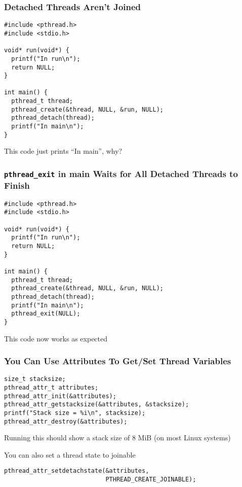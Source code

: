   \begin{frame}[fragile]
    \frametitle{Detached Threads Aren't Joined}

    \begin{lstlisting}
#include <pthread.h>
#include <stdio.h>

void* run(void*) {
  printf("In run\n");
  return NULL;
}

int main() {
  pthread_t thread;
  pthread_create(&thread, NULL, &run, NULL);
  pthread_detach(thread);
  printf("In main\n");
}
    \end{lstlisting}

    This code just prints ``In main'', why?
  \end{frame}

  \begin{frame}[fragile]
    \frametitle{\texttt{pthread\_exit} in main Waits for All Detached Threads to Finish}

    \begin{lstlisting}
#include <pthread.h>
#include <stdio.h>

void* run(void*) {
  printf("In run\n");
  return NULL;
}

int main() {
  pthread_t thread;
  pthread_create(&thread, NULL, &run, NULL);
  pthread_detach(thread);
  printf("In main\n");
  pthread_exit(NULL);
}
    \end{lstlisting}

    This code now works as expected
  \end{frame}

  \begin{frame}[fragile]
    \frametitle{You Can Use Attributes To Get/Set Thread Variables}

    \begin{lstlisting}
size_t stacksize;
pthread_attr_t attributes;
pthread_attr_init(&attributes);
pthread_attr_getstacksize(&attributes, &stacksize);
printf("Stack size = %i\n", stacksize);
pthread_attr_destroy(&attributes);
    \end{lstlisting}

    \vspace{2em}

    Running this should show a stack size of 8 MiB (on most Linux systems)

    \vspace{2em}

    You can also set a thread state to joinable

    \begin{lstlisting}
pthread_attr_setdetachstate(&attributes,
                            PTHREAD_CREATE_JOINABLE);
    \end{lstlisting}
  \end{frame}

